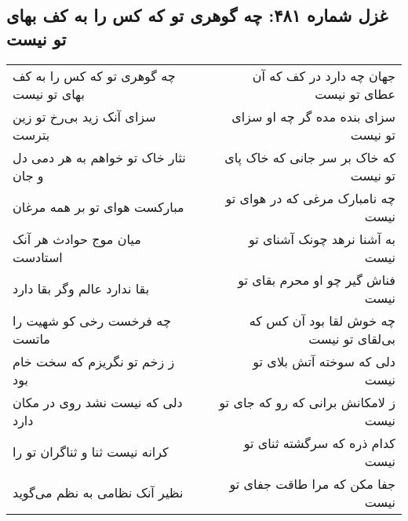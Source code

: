\begin{center}
\section*{غزل شماره ۴۸۱: چه گوهری تو که کس را به کف بهای تو نیست}
\label{sec:0481}
\begin{longtable}{l p{0.5cm} r}
چه گوهری تو که کس را به کف بهای تو نیست
&&
جهان چه دارد در کف که آن عطای تو نیست
\\
سزای آنک زید بی‌رخ تو زین بترست
&&
سزای بنده مده گر چه او سزای تو نیست
\\
نثار خاک تو خواهم به هر دمی دل و جان
&&
که خاک بر سر جانی که خاک پای تو نیست
\\
مبارکست هوای تو بر همه مرغان
&&
چه نامبارک مرغی که در هوای تو نیست
\\
میان موج حوادث هر آنک استادست
&&
به آشنا نرهد چونک آشنای تو نیست
\\
بقا ندارد عالم وگر بقا دارد
&&
فناش گیر چو او محرم بقای تو نیست
\\
چه فرخست رخی کو شهیت را ماتست
&&
چه خوش لقا بود آن کس که بی‌لقای تو نیست
\\
ز زخم تو نگریزم که سخت خام بود
&&
دلی که سوخته آتش بلای تو نیست
\\
دلی که نیست نشد روی در مکان دارد
&&
ز لامکانش برانی که رو که جای تو نیست
\\
کرانه نیست ثنا و ثناگران تو را
&&
کدام ذره که سرگشته ثنای تو نیست
\\
نظیر آنک نظامی به نظم می‌گوید
&&
جفا مکن که مرا طاقت جفای تو نیست
\\
\end{longtable}
\end{center}
